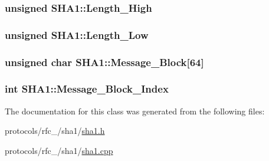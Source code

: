 \hypertarget{classSHA1_a93956884da01c8a30acc5a0a2a274730}{
\subsubsection[{\-Length\-\_\-\-High}]{\setlength{\rightskip}{0pt plus 5cm}unsigned {\bf \-S\-H\-A1\-::\-Length\-\_\-\-High}}}\label{classSHA1_a93956884da01c8a30acc5a0a2a274730}
\hypertarget{classSHA1_afb5ee6b8e9b99eb73e7d9f41b030d801}{
\subsubsection[{\-Length\-\_\-\-Low}]{\setlength{\rightskip}{0pt plus 5cm}unsigned {\bf \-S\-H\-A1\-::\-Length\-\_\-\-Low}}}\label{classSHA1_afb5ee6b8e9b99eb73e7d9f41b030d801}
\hypertarget{classSHA1_a94c8fabb04fabd4604503512a4cc56a5}{
\subsubsection[{\-Message\-\_\-\-Block}]{\setlength{\rightskip}{0pt plus 5cm}unsigned char {\bf \-S\-H\-A1\-::\-Message\-\_\-\-Block}\mbox{[}64\mbox{]}}}\label{classSHA1_a94c8fabb04fabd4604503512a4cc56a5}
\hypertarget{classSHA1_a3046d0eca31827c928c35d123db86c53}{
\subsubsection[{\-Message\-\_\-\-Block\-\_\-\-Index}]{\setlength{\rightskip}{0pt plus 5cm}int {\bf \-S\-H\-A1\-::\-Message\-\_\-\-Block\-\_\-\-Index}}}\label{classSHA1_a3046d0eca31827c928c35d123db86c53}


\-The documentation for this class was generated from the following files\-:\begin{DoxyCompactItemize}
\item 
protocols/rfc\-\_/sha1/\hyperlink{sha1_8h}{sha1.\-h}\item 
protocols/rfc\-\_/sha1/\hyperlink{sha1_8cpp}{sha1.\-cpp}\end{DoxyCompactItemize}
